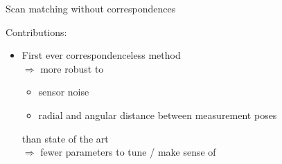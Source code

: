 \begin{frame}{Scan matching without correspondences}

  Contributions:
  \begin{itemize}
    \item First ever correspondenceless method\\
    $\Rightarrow$ more robust to\\
    \begin{itemize}
      \item sensor noise
      \item radial and angular distance between measurement poses
    \end{itemize}
      than state of the art\\
    $\Rightarrow$ fewer parameters to tune / make sense of
  \end{itemize}

\end{frame}
